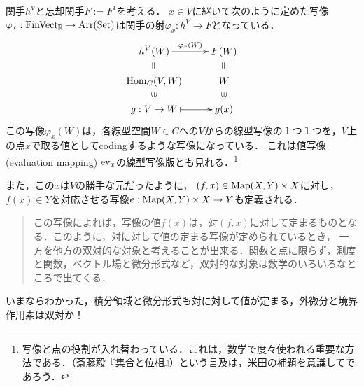 \documentclass[uplatex, dvipdfmx]{jsreport}
\begin{document}
\begin{example}\label{exp-vectorspace-1}
    関手$h^V$と忘却関手$F:=F^1$を考える．
    $x\in V$に継いて次のように定めた写像$\varphi_x:\mathrm{FinVect}_{\mathbb{R}}\to \mathrm{Arr}(\mathrm{Set})$は関手の射$\varphi_x:h^V\to F$となっている．
    \[\xymatrix@R-2pc{
        h^V(W)\ar[r]^-{\varphi_x(W)}&F(W)\\
        {\rotatebox{90}{=}}&{\rotatebox{90}{=}}\\
        \Hom_C(V,W)&W\\
        {\rotatebox{90}{$\in$}}&{\rotatebox{90}{$\in$}}\\
        g:V\to W\ar@{|->}[r]&g(x)
    }\]
    この写像$\varphi_x(W)$は，各線型空間$W\in C$への$V$からの線型写像の１つ１つを，$V$上の点$x$で取る値としてcodingするような写像になっている．
    これは値写像(evaluation mapping) $\mathrm{ev}_x$の線型写像版とも見れる．\footnote{写像と点の役割が入れ替わっている．これは，数学で度々使われる重要な方法である．（斎藤毅『集合と位相』）という言及は，米田の補題を意識してであろう．}
\end{example}
\begin{remark}
    また，この$x$は$V$の勝手な元だったように，
    $(f,x)\in\mathrm{Map}(X,Y)\times X$に対し，$f(x)\in Y$を対応させる写像$e:\mathrm{Map}(X,Y)\times X\to Y$も定義される．
    \begin{quote}
        この写像によれば，写像の値$f(x)$は，対$(f,x)$に対して定まるものとなる．このように，対に対して値の定まる写像が定められているとき，
        一方を他方の双対的な対象と考えることが出来る．関数と点に限らず，測度と関数，ベクトル場と微分形式など，双対的な対象は数学のいろいろなところで出てくる．
    \end{quote}
    いまならわかった，積分領域と微分形式も対に対して値が定まる，外微分と境界作用素は双対か！
\end{remark}
\end{document}
